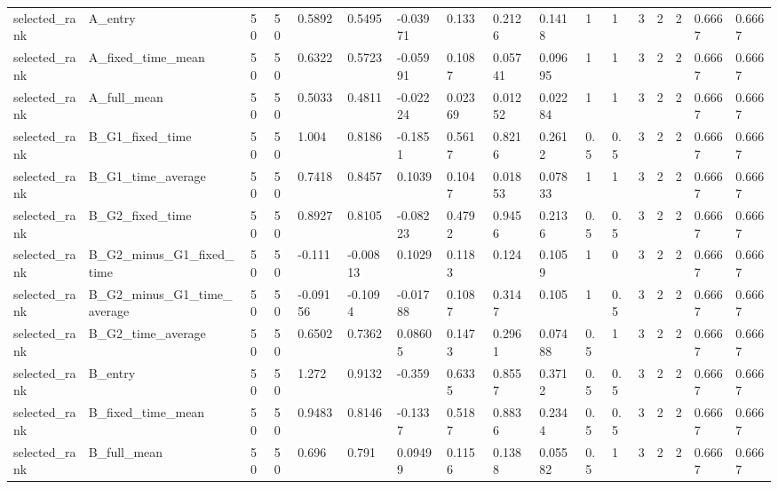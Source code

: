\begin{longtable}{lllllllllllllllll}
selected\_rank & A\_entry & 50 & 50 & 0.5892 & 0.5495 & -0.03971 & 0.133 & 0.2126 & 0.1418 & 1 & 1 & 3 & 2 & 2 & 0.6667 & 0.6667 \\
selected\_rank & A\_fixed\_time\_mean & 50 & 50 & 0.6322 & 0.5723 & -0.05991 & 0.1087 & 0.05741 & 0.09695 & 1 & 1 & 3 & 2 & 2 & 0.6667 & 0.6667 \\
selected\_rank & A\_full\_mean & 50 & 50 & 0.5033 & 0.4811 & -0.02224 & 0.02369 & 0.01252 & 0.02284 & 1 & 1 & 3 & 2 & 2 & 0.6667 & 0.6667 \\
selected\_rank & B\_G1\_fixed\_time & 50 & 50 & 1.004 & 0.8186 & -0.1851 & 0.5617 & 0.8216 & 0.2612 & 0.5 & 0.5 & 3 & 2 & 2 & 0.6667 & 0.6667 \\
selected\_rank & B\_G1\_time\_average & 50 & 50 & 0.7418 & 0.8457 & 0.1039 & 0.1047 & 0.01853 & 0.07833 & 1 & 1 & 3 & 2 & 2 & 0.6667 & 0.6667 \\
selected\_rank & B\_G2\_fixed\_time & 50 & 50 & 0.8927 & 0.8105 & -0.08223 & 0.4792 & 0.9456 & 0.2136 & 0.5 & 0.5 & 3 & 2 & 2 & 0.6667 & 0.6667 \\
selected\_rank & B\_G2\_minus\_G1\_fixed\_time & 50 & 50 & -0.111 & -0.00813 & 0.1029 & 0.1183 & 0.124 & 0.1059 & 1 & 0 & 3 & 2 & 2 & 0.6667 & 0.6667 \\
selected\_rank & B\_G2\_minus\_G1\_time\_average & 50 & 50 & -0.09156 & -0.1094 & -0.01788 & 0.1087 & 0.3147 & 0.105 & 1 & 0.5 & 3 & 2 & 2 & 0.6667 & 0.6667 \\
selected\_rank & B\_G2\_time\_average & 50 & 50 & 0.6502 & 0.7362 & 0.08605 & 0.1473 & 0.2961 & 0.07488 & 0.5 & 1 & 3 & 2 & 2 & 0.6667 & 0.6667 \\
selected\_rank & B\_entry & 50 & 50 & 1.272 & 0.9132 & -0.359 & 0.6335 & 0.8557 & 0.3712 & 0.5 & 0.5 & 3 & 2 & 2 & 0.6667 & 0.6667 \\
selected\_rank & B\_fixed\_time\_mean & 50 & 50 & 0.9483 & 0.8146 & -0.1337 & 0.5187 & 0.8836 & 0.2344 & 0.5 & 0.5 & 3 & 2 & 2 & 0.6667 & 0.6667 \\
selected\_rank & B\_full\_mean & 50 & 50 & 0.696 & 0.791 & 0.09499 & 0.1156 & 0.1388 & 0.05582 & 0.5 & 1 & 3 & 2 & 2 & 0.6667 & 0.6667 \\
\bottomrule
\end{longtable}
\endgroup
